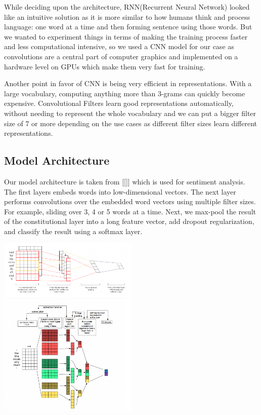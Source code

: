 \documentclass[10pt, oneside]{article}
\begin{document}
\begin{multicols}{2}
While deciding upon the architecture, RNN(Recurrent Neural Network) looked like an intuitive solution as it is more similar to how humans think and process language: one word at a time and then forming sentence using those words. But we wanted to experiment things in terms of making the training process faster and less computational intensive, so we used a CNN model for our case as convolutions are a central part of computer graphics and implemented on a hardware level on GPUs which make them very fast for training.

Another point in favor of CNN is being very efficient in representations.  With a large vocabulary, computing anything more than 3-grams can quickly become expensive.  Convolutional Filters learn good representations automatically, without needing to represent the whole vocabulary and we can put a bigger filter size of 7 or more depending on the use cases as different filter sizes learn different representations. 

\subsection{Model Architecture}

Our model architecture is taken from [[]] which is used for sentiment analysis. The first layers embeds words into low-dimensional vectors. The next layer performs convolutions over the embedded word vectors using multiple filter sizes. For example, sliding over 3, 4 or 5 words at a time. Next, we max-pool the result of the constitutional layer into a long feature vector, add dropout regularization, and classify the result using a softmax layer.

\includegraphics[width=0.5\textwidth]{images/cnn_architecture1.png}
\includegraphics[width=0.5\textwidth]{images/cnn_architecture2.png}


\end{multicols}
\end{document}
